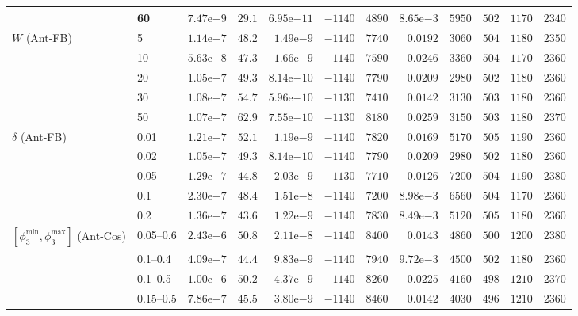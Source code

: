 \begin{tabular}{llrrrrrrrrrr}
 & 60 & $7.47\mathrm{e}{-9}$ & $29.1$ & $6.95\mathrm{e}{-11}$ & $-1140$ & $4890$ & $8.65\mathrm{e}{-3}$ & $5950$ & $502$ & $1170$ & $2340$ \\
\midrule
$W$ (Ant-FB) & 5 & $1.14\mathrm{e}{-7}$ & $48.2$ & $1.49\mathrm{e}{-9}$ & $-1140$ & $7740$ & $0.0192$ & $3060$ & $504$ & $1180$ & $2350$ \\
 & 10 & $5.63\mathrm{e}{-8}$ & $47.3$ & $1.66\mathrm{e}{-9}$ & $-1140$ & $7590$ & $0.0246$ & $3360$ & $504$ & $1170$ & $2360$ \\
 & 20 & $1.05\mathrm{e}{-7}$ & $49.3$ & $8.14\mathrm{e}{-10}$ & $-1140$ & $7790$ & $0.0209$ & $2980$ & $502$ & $1180$ & $2360$ \\
 & 30 & $1.08\mathrm{e}{-7}$ & $54.7$ & $5.96\mathrm{e}{-10}$ & $-1130$ & $7410$ & $0.0142$ & $3130$ & $503$ & $1180$ & $2360$ \\
 & 50 & $1.07\mathrm{e}{-7}$ & $62.9$ & $7.55\mathrm{e}{-10}$ & $-1130$ & $8180$ & $0.0259$ & $3150$ & $503$ & $1180$ & $2370$ \\
\midrule
$\delta$ (Ant-FB) & 0.01 & $1.21\mathrm{e}{-7}$ & $52.1$ & $1.19\mathrm{e}{-9}$ & $-1140$ & $7820$ & $0.0169$ & $5170$ & $505$ & $1190$ & $2360$ \\
 & 0.02 & $1.05\mathrm{e}{-7}$ & $49.3$ & $8.14\mathrm{e}{-10}$ & $-1140$ & $7790$ & $0.0209$ & $2980$ & $502$ & $1180$ & $2360$ \\
 & 0.05 & $1.29\mathrm{e}{-7}$ & $44.8$ & $2.03\mathrm{e}{-9}$ & $-1130$ & $7710$ & $0.0126$ & $7200$ & $504$ & $1190$ & $2380$ \\
 & 0.1 & $2.30\mathrm{e}{-7}$ & $48.4$ & $1.51\mathrm{e}{-8}$ & $-1140$ & $7200$ & $8.98\mathrm{e}{-3}$ & $6560$ & $504$ & $1170$ & $2360$ \\
 & 0.2 & $1.36\mathrm{e}{-7}$ & $43.6$ & $1.22\mathrm{e}{-9}$ & $-1140$ & $7830$ & $8.49\mathrm{e}{-3}$ & $5120$ & $505$ & $1180$ & $2360$ \\
\midrule
$[\phi_3^{\min},\phi_3^{\max}]$ (Ant-Cos) & 0.05--0.6 & $2.43\mathrm{e}{-6}$ & $50.8$ & $2.11\mathrm{e}{-8}$ & $-1140$ & $8400$ & $0.0143$ & $4860$ & $500$ & $1200$ & $2380$ \\
 & 0.1--0.4 & $4.09\mathrm{e}{-7}$ & $44.4$ & $9.83\mathrm{e}{-9}$ & $-1140$ & $7940$ & $9.72\mathrm{e}{-3}$ & $4500$ & $502$ & $1180$ & $2360$ \\
 & 0.1--0.5 & $1.00\mathrm{e}{-6}$ & $50.2$ & $4.37\mathrm{e}{-9}$ & $-1140$ & $8260$ & $0.0225$ & $4160$ & $498$ & $1210$ & $2370$ \\
 & 0.15--0.5 & $7.86\mathrm{e}{-7}$ & $45.5$ & $3.80\mathrm{e}{-9}$ & $-1140$ & $8460$ & $0.0142$ & $4030$ & $496$ & $1210$ & $2360$ \\

\end{tabular}
